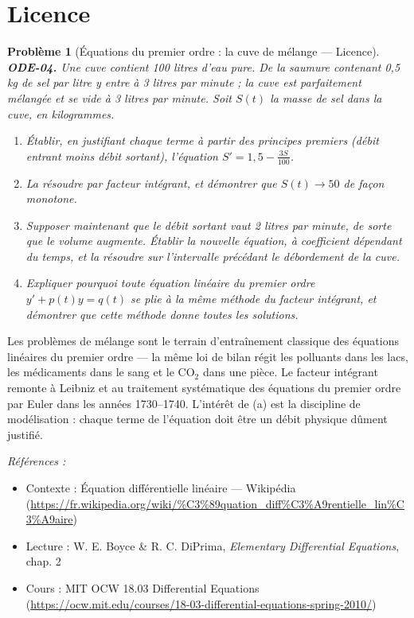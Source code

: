 \documentclass[11pt]{article}
\newtheorem{problem}{Problème}
\newenvironment{refs}{\par\small\noindent\emph{Références :}\begin{itemize}\setlength\itemsep{0pt}}{\end{itemize}\normalsize}
\begin{document}
\bigskip


\section*{Licence}

\begin{problem}[{Équations du premier ordre : la cuve de mélange --- Licence}]
\textbf{ODE-04.} Une cuve contient 100 litres d'eau pure. De la saumure contenant 0,5 kg de
sel par litre y entre à 3 litres par minute ; la cuve est parfaitement mélangée et se vide à
3 litres par minute. Soit $ S(t) $ la masse de sel dans la cuve, en kilogrammes.
\begin{enumerate}
\item[(a)] Établir, en justifiant chaque terme à partir des principes premiers (débit entrant moins
débit sortant), l'équation $ S' = 1{,}5 - \frac{3S}{100} $.
\item[(b)] La résoudre par facteur intégrant, et démontrer que $ S(t) \to 50 $ de façon
monotone.
\item[(c)] Supposer maintenant que le débit sortant vaut 2 litres par minute, de sorte que le volume
augmente. Établir la nouvelle équation, à coefficient dépendant du temps, et la résoudre sur
l'intervalle précédant le débordement de la cuve.
\item[(d)] Expliquer pourquoi toute équation linéaire du premier ordre $ y' + p(t) y = q(t) $ se
plie à la même méthode du facteur intégrant, et démontrer que cette méthode donne
\textit{toutes} les solutions.
\end{enumerate}

\end{problem}

\noindent Les problèmes de mélange sont le terrain d'entraînement classique des équations
linéaires du premier ordre --- la même loi de bilan régit les polluants dans les lacs, les
médicaments dans le sang et le CO$_2$ dans une pièce. Le facteur intégrant remonte à Leibniz et au
traitement systématique des équations du premier ordre par Euler dans les années 1730--1740.
L'intérêt de (a) est la discipline de modélisation : chaque terme de l'équation doit être un
débit physique dûment justifié.

\begin{refs}
\item Contexte : Équation différentielle linéaire --- Wikipédia (\url{https://fr.wikipedia.org/wiki/%C3%89quation_diff%C3%A9rentielle_lin%C3%A9aire})
\item Lecture : W. E. Boyce \& R. C. DiPrima, \textit{Elementary Differential Equations}, chap. 2
\item Cours : MIT OCW 18.03 Differential Equations (\url{https://ocw.mit.edu/courses/18-03-differential-equations-spring-2010/})
\end{refs}
\end{document}
